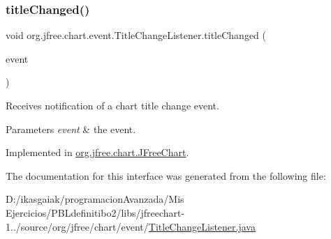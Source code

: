 \subsubsection{\texorpdfstring{title\+Changed()}{titleChanged()}}
{\footnotesize\ttfamily void org.\+jfree.\+chart.\+event.\+Title\+Change\+Listener.\+title\+Changed (\begin{DoxyParamCaption}\item[{\mbox{\hyperlink{classorg_1_1jfree_1_1chart_1_1event_1_1_title_change_event}{Title\+Change\+Event}}}]{event }\end{DoxyParamCaption})}

Receives notification of a chart title change event.


\begin{DoxyParams}{Parameters}
{\em event} & the event. \\
\hline
\end{DoxyParams}


Implemented in \mbox{\hyperlink{classorg_1_1jfree_1_1chart_1_1_j_free_chart_aff951e786b0f0e11bbe4842f27ddffc9}{org.\+jfree.\+chart.\+J\+Free\+Chart}}.



The documentation for this interface was generated from the following file\+:\begin{DoxyCompactItemize}
\item 
D\+:/ikasgaiak/programacion\+Avanzada/\+Mis Ejercicios/\+P\+B\+Ldefinitibo2/libs/jfreechart-\/1../source/org/jfree/chart/event/\mbox{\hyperlink{_title_change_listener_8java}{Title\+Change\+Listener.\+java}}\end{DoxyCompactItemize}
